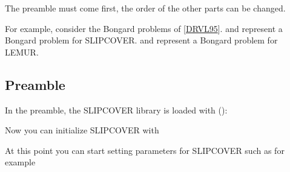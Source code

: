 \documentclass[letterpaper,10pt,english]{sphinxmanual}
\begin{document}
\sphinxAtStartPar
The preamble must come first, the order of the other parts can be changed.

\sphinxAtStartPar
For example, consider the Bongard problems of {[}\hyperlink{cite.index:id62}{DRVL95}{]}.  and  represent a Bongard problem for SLIPCOVER.
 and  represent a Bongard problem for LEMUR.


\subsection{Preamble}
\label{\detokenize{index:preamble}}
\sphinxAtStartPar
In the preamble, the SLIPCOVER library is loaded with ():

\begin{sphinxVerbatim}[commandchars=\\\{\}]
 
\end{sphinxVerbatim}

\sphinxAtStartPar
Now you can initialize SLIPCOVER with

\begin{sphinxVerbatim}[commandchars=\\\{\}]
 
\end{sphinxVerbatim}

\sphinxAtStartPar
At this point you can start setting parameters for SLIPCOVER such as for example

\begin{sphinxVerbatim}[commandchars=\\\{\}]
 
 
 
 
\end{sphinxVerbatim}
\end{document}
